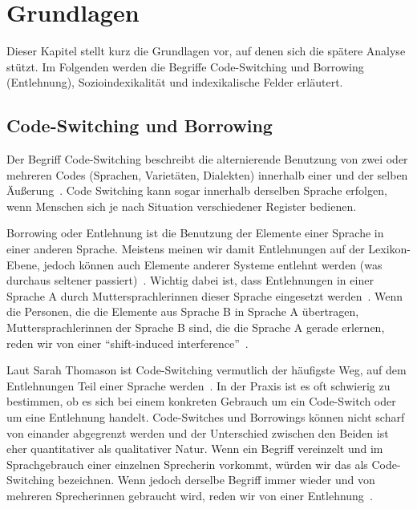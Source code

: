 \section{Grundlagen}
\label{chap:basics}

\begin{comment}
Begriffe:
* code switching
(* borrowings)
* language shift
* Sozioindexikalität
* Indexical field?
* Medientheorie?
\end{comment}


Dieser Kapitel stellt kurz die Grundlagen vor, auf denen sich die spätere Analyse stützt.
Im Folgenden werden die Begriffe Code-Switching und Borrowing (Entlehnung),
Sozioindexikalität und indexikalische Felder erläutert.

\subsection{Code-Switching und Borrowing}
Der Begriff Code-Switching beschreibt die alternierende Benutzung von zwei oder mehreren Codes (Sprachen, Varietäten, Dialekten) innerhalb einer und der selben Äußerung~\cite[]{Pfaff79}.
Code Switching kann sogar innerhalb derselben Sprache erfolgen, wenn Menschen sich je nach Situation verschiedener Register bedienen.

Borrowing oder Entlehnung ist die Benutzung der Elemente einer Sprache in einer anderen Sprache.
Meistens meinen wir damit Entlehnungen auf der Lexikon-Ebene, jedoch können auch Elemente anderer Systeme entlehnt werden (was durchaus seltener passiert)~\cite{Thomason03}.%
Wichtig dabei ist, dass Entlehnungen in einer Sprache A durch Muttersprachlerinnen dieser Sprache eingesetzt werden~\cite{Thomason03}. %
Wenn die Personen, die die Elemente aus Sprache B in Sprache A übertragen, Muttersprachlerinnen der Sprache B sind, die die Sprache A gerade erlernen, reden wir von einer ``shift-induced interference''~\cite{Thomason03}. %

Laut Sarah Thomason ist Code-Switching vermutlich der häufigste Weg, auf dem Entlehnungen Teil einer Sprache werden~\cite{Thomason03}. %
In der Praxis ist es oft schwierig zu bestimmen, ob es sich bei einem konkreten Gebrauch um ein Code-Switch oder um eine Entlehnung handelt.
Code-Switches und Borrowings können nicht scharf von einander abgegrenzt werden und der Unterschied zwischen den Beiden ist eher quantitativer als qualitativer Natur.
Wenn ein Begriff vereinzelt und im Sprachgebrauch einer einzelnen Sprecherin vorkommt, würden wir das als Code-Switching bezeichnen.
Wenn jedoch derselbe Begriff immer wieder und von mehreren Sprecherinnen gebraucht wird, reden wir von einer Entlehnung~\cite{Thomason03}. %

